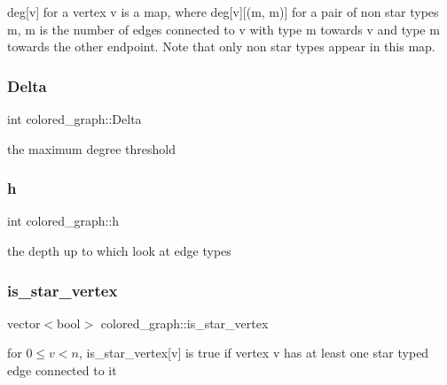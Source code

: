 deg\mbox{[}v\mbox{]} for a vertex v is a map, where deg\mbox{[}v\mbox{]}\mbox{[}(m, m\textquotesingle{})\mbox{]} for a pair of non star types m, m\textquotesingle{} is the number of edges connected to v with type m towards v and type m\textquotesingle{} towards the other endpoint. Note that only non star types appear in this map. 

\mbox{\label{classcolored__graph_a5b0e93eb40a20dc815c809dee11edc12}} 
\subsubsection{\texorpdfstring{Delta}{Delta}}
{\footnotesize\ttfamily int colored\+\_\+graph\+::\+Delta}



the maximum degree threshold 

\mbox{\label{classcolored__graph_ae27062a4ee59df2670d3a0c81e85a3fa}} 
\subsubsection{\texorpdfstring{h}{h}}
{\footnotesize\ttfamily int colored\+\_\+graph\+::h}



the depth up to which look at edge types 

\mbox{\label{classcolored__graph_ad41163e970530c7e45878d299f0dc961}} 
\subsubsection{\texorpdfstring{is\+\_\+star\+\_\+vertex}{is\_star\_vertex}}
{\footnotesize\ttfamily vector$<$bool$>$ colored\+\_\+graph\+::is\+\_\+star\+\_\+vertex}



for $0 \leq v < n$, is\+\_\+star\+\_\+vertex\mbox{[}v\mbox{]} is true if vertex v has at least one star typed edge connected to it 

